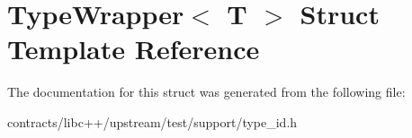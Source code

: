 \hypertarget{struct_type_wrapper}{}\section{Type\+Wrapper$<$ T $>$ Struct Template Reference}
\label{struct_type_wrapper}


The documentation for this struct was generated from the following file\+:\begin{DoxyCompactItemize}
\item 
contracts/libc++/upstream/test/support/type\+\_\+id.\+h\end{DoxyCompactItemize}
